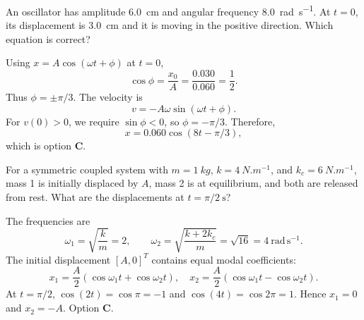 \begin{quizquestion}[
  id=phy104-osc-041,
  topic=oscillations,
  difficulty=challenge,
  marks=3,
  correct=C,
  tags={shm,initial-conditions,phase-direction},
  outcome={Construct an SHM equation from displacement and direction}
]
  An oscillator has amplitude \SI{6.0}{cm} and angular frequency \SI{8.0}{rad.s^{-1}}. At \(t=0\), its displacement is \SI{3.0}{cm} and it is moving in the positive direction. Which equation is correct?
\end{quizquestion}
\begin{quizsolution}
  Using \(x=A\cos(\omega t+\phi)\) at \(t=0\),
  \[
    \cos\phi=\frac{x_0}{A}=\frac{0.030}{0.060}=\frac12.
  \]
  Thus \(\phi=\pm\pi/3\). The velocity is
  \[
    v=-A\omega\sin(\omega t+\phi).
  \]
  For \(v(0)>0\), we require \(\sin\phi<0\), so \(\phi=-\pi/3\). Therefore,
  \[
    x=0.060\cos(8t-\pi/3),
  \]
  which is option \textbf{C}.
\end{quizsolution}

\begin{quizquestion}[
  id=phy104-nm-046,
  topic=normal-modes,
  difficulty=challenge,
  marks=3,
  correct=C,
  tags={coupled-oscillators,modal-superposition,time-evolution},
  outcome={Use modal superposition to determine coupled-system motion}
]
  For a symmetric coupled system with \(m=\SI{1}{kg}\), \(k=\SI{4}{N.m^{-1}}\), and \(k_c=\SI{6}{N.m^{-1}}\), mass 1 is initially displaced by \(A\), mass 2 is at equilibrium, and both are released from rest. What are the displacements at \(t=\pi/2\ \mathrm{s}\)?
\end{quizquestion}
\begin{quizsolution}
  The frequencies are
  \[
    \omega_1=\sqrt{\frac{k}{m}}=2,
    \qquad
    \omega_2=\sqrt{\frac{k+2k_c}{m}}=\sqrt{16}=4\ \mathrm{rad\,s^{-1}}.
  \]
  The initial displacement \({[A,0]}^T\) contains equal modal coefficients:
  \[
    x_1=\frac{A}{2}(\cos\omega_1t+\cos\omega_2t),
    \quad
    x_2=\frac{A}{2}(\cos\omega_1t-\cos\omega_2t).
  \]
  At \(t=\pi/2\), \(\cos(2t)=\cos\pi=-1\) and \(\cos(4t)=\cos2\pi=1\). Hence \(x_1=0\) and \(x_2=-A\). Option \textbf{C}.
\end{quizsolution}

